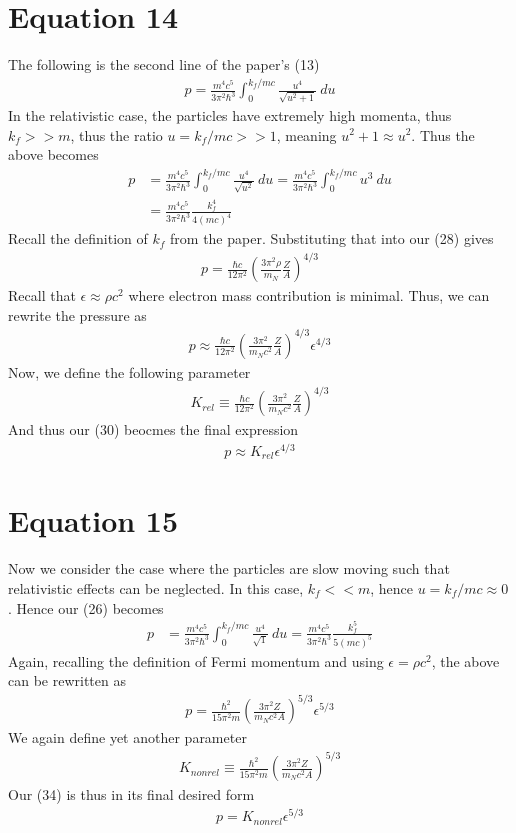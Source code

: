 \documentclass{article}
\begin{document}
\section*{Equation 14}
The following is the second line of the paper's (13)
\begin{align}
    p=\frac{m^4c^5}{3\pi^2\hbar^3}\int_0^{k_f/mc}\frac{u^4}{\sqrt{u^2+1}}\ du
\end{align}
In the relativistic case, the particles have extremely high momenta, thus $k_f>>m$, thus the ratio $u=k_f/mc>>1$, meaning $u^2+1\approx u^2$. 
Thus the above becomes 
\begin{align}
    p&=\frac{m^4c^5}{3\pi^2\hbar^3}\int_0^{k_f/mc}\frac{u^4}{\sqrt{u^2}}\ du=\frac{m^4c^5}{3\pi^2\hbar^3}\int_0^{k_f/mc}u^3\ du\\
    &=\frac{m^4c^5}{3\pi^2\hbar^3}\frac{k_f^4}{4(mc)^4}
\end{align}
Recall the definition of $k_f$ from the paper. Substituting that into our (28) gives 
\begin{align}
    p=\frac{\hbar c}{12\pi^2}(\frac{3\pi^2\rho}{m_N}\frac{Z}{A})^{4/3}
\end{align}
Recall that $\epsilon\approx \rho c^2$ where electron mass contribution is minimal. Thus,  we can rewrite the pressure as 
\begin{align}
    p\approx\frac{\hbar c}{12\pi^2}(\frac{3\pi^2}{m_Nc^2}\frac{Z}{A})^{4/3}\epsilon^{4/3}
\end{align}
Now, we define the following parameter 
\begin{align}
    K_{rel}\equiv\frac{\hbar c}{12\pi^2}(\frac{3\pi^2}{m_Nc^2}\frac{Z}{A})^{4/3}
\end{align}
And thus our (30) beocmes the final expression 
\begin{align}
    \boxed{p\approx K_{rel}\epsilon^{4/3}}
\end{align}
\section*{Equation 15}
Now we consider the case where the particles are slow moving such that relativistic effects can 
be neglected. In this case, $k_f<<m$, hence $u=k_f/mc\approx0$. Hence our (26) becomes 
\begin{align}
    p&=\frac{m^4c^5}{3\pi^2\hbar^3}\int_0^{k_f/mc}\frac{u^4}{\sqrt{1}}\ du=\frac{m^4c^5}{3\pi^2\hbar^3}\frac{k_f^5}{5(mc)^5}
\end{align}
Again, recalling the definition of Fermi momentum and using $\epsilon=\rho c^2$, the above can be rewritten as 
\begin{align}
    p=\frac{\hbar^2}{15\pi^2m}(\frac{3\pi^2 Z}{m_N c^2 A})^{5/3}\epsilon^{5/3}
\end{align}
We again define yet another parameter 
\begin{align}
    K_{nonrel}\equiv\frac{\hbar^2}{15\pi^2m}(\frac{3\pi^2 Z}{m_N c^2 A})^{5/3}
\end{align}
Our (34) is thus in its final desired form 
\begin{align}
    \boxed{p=K_{nonrel}\epsilon^{5/3}}
\end{align}
\end{document}
